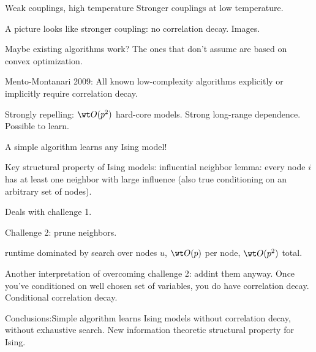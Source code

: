 Weak couplings, high temperature %
Stronger couplings at low temperature.

A picture looks like stronger coupling: no correlation decay. Images.

Maybe existing algorithms work? The ones that don't assume are based on convex optimization. 

Mento-Montanari 2009:
All known low-complexity algorithms explicitly or implicitly require correlation decay.

Strongly repelling: $\wt O(p^2)$ hard-core models. Strong long-range dependence. Possible to learn. 

A simple algorithm learns any Ising model!

Key structural property of Ising models: influential neighbor lemma: every node $i$ has at least one neighbor with large influence (also true conditioning on an arbitrary set of nodes).

Deals with challenge 1. 

Challenge 2: prune neighbors.

runtime dominated by search over nodes $u$, $\wt O(p)$ per node, $\wt O(p^2)$ total.

Another interpretation of overcoming challenge 2: addint them anyway. Once you've conditioned on well chosen set of variables, you do have correlation decay. Conditional correlation decay.

Conclusions:Simple algorithm learns Ising models without correlation decay, without exhaustive search. New information theoretic structural property for Ising.


